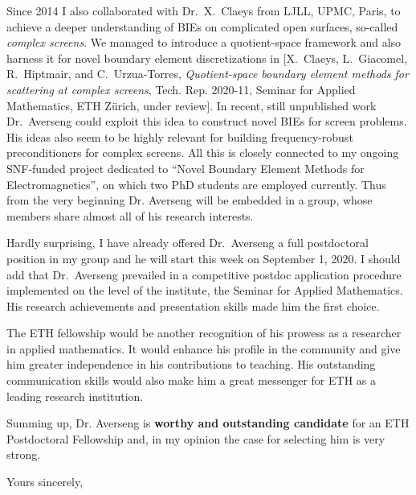 \documentclass[english]{ethbrief3}
\begin{document}
Since 2014 I also collaborated with Dr.~X.~Claeys from LJLL, UPMC, Paris, to achieve a
deeper understanding of BIEs on complicated open surfaces, so-called \emph{complex
  screens}. We managed to introduce a quotient-space framework and also harness it for
novel boundary element discretizations in $[${\sc X.~Claeys, L.~Giacomel, R.~Hiptmair, and
  C.~Urzua-Torres}, {\em Quotient-space boundary element methods for scattering at complex
  screens}, Tech. Rep. 2020-11, Seminar for Applied Mathematics, ETH Z{\"u}rich, under
review$]$. In recent, still unpublished work Dr.~Averseng could exploit this idea to
construct novel BIEs for screen problems. His ideas also seem to be highly relevant for
building frequency-robust preconditioners for complex screens. All this is closely
connected to my ongoing SNF-funded project dedicated to ``Novel Boundary Element Methods
for Electromagnetics'', on which two PhD students are employed currently. Thus from the
very beginning Dr. Averseng will be embedded in a group, whose members share almost all of
his research interests.

Hardly surprising, I have already offered Dr.~Averseng a full postdoctoral position in my
group and he will start this week on September 1, 2020. I should add that Dr.~Averseng
prevailed in a competitive postdoc application procedure implemented on the level of the
institute, the Seminar for Applied Mathematics. His research achievements and presentation
skills made him the first choice.

The ETH fellowship would be another recognition of his prowess as a researcher in applied
mathematics. It would enhance his profile in the community and give him greater
independence in his contributions to teaching. His outstanding communication skills would also
make him a great messenger for ETH as a leading research institution.

Summing up, Dr. Averseng is \textbf{worthy and outstanding candidate} for an ETH
Postdoctoral Fellowship and, in my opinion the case for selecting him is very strong.
	
   \closing{Yours sincerely,}

\end{document}
